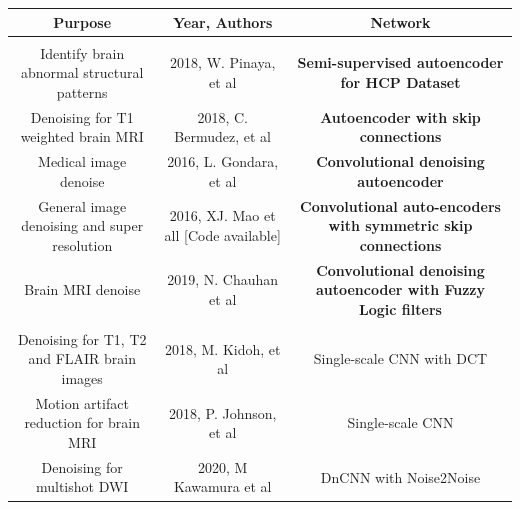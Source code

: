 \begin{table}[!ht]
    \setlength\extrarowheight{2pt} %
    \begin{tabularx}{\textwidth}{C C C}
    \hline
        \textbf{Purpose} & \textbf{Year, Authors} & \textbf{Network} \\
        \hline
        
        \\
        
        \hline
        
        Identify brain abnormal structural patterns & 2018, W. Pinaya, et al \cite{pinaya2019} & \textbf{Semi-supervised autoencoder for HCP Dataset} \\
        
        Denoising for T1 weighted brain MRI & 2018, C. Bermudez, et al \cite{bermudez2018t1autoencoder} & \textbf{Autoencoder with skip connections} \\
        
        Medical image denoise & 2016, L. Gondara, et al \cite{gondara2016medicalautoencoder} &\textbf{Convolutional denoising autoencoder} \\
        
        General image denoising and super resolution & 2016, XJ. Mao et all \cite{superresolution} [Code available] & \textbf{Convolutional auto-encoders with symmetric skip connections} \\
        
        Brain MRI denoise & 2019, N. Chauhan et al \cite{fuzzyautoencoder} & \textbf{Convolutional denoising autoencoder with Fuzzy Logic filters} \\

        \hline
        \\
        \hline

        Denoising for T1, T2 and FLAIR brain images & 2018, M. Kidoh, et al \cite{kidoh2019scnnt1} & Single-scale CNN with DCT \\
        
        Motion artifact reduction for brain MRI & 2018, P. Johnson, et al \cite{scnnmotion} & Single-scale CNN\\
        
        Denoising for multishot DWI & 2020, M Kawamura et al \cite{dncnnnoise2noise} & DnCNN with Noise2Noise \\
        

\end{tabularx}
\end{table}
